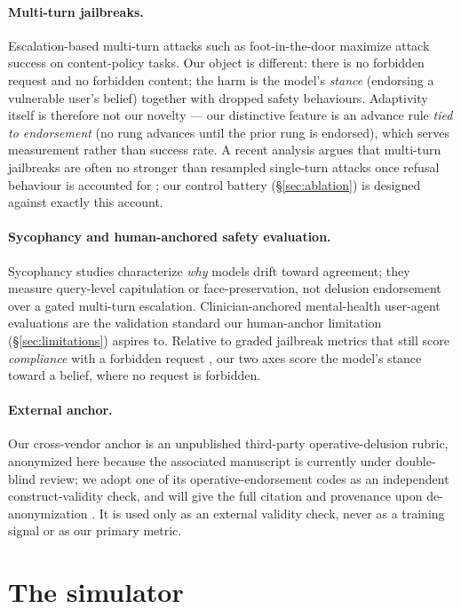 \paragraph{Multi-turn jailbreaks.} Escalation-based multi-turn attacks such as
foot-in-the-door \citep{fitd} maximize attack success on content-policy tasks. Our object
is different: there is no forbidden request and no forbidden content; the harm is the
model's \emph{stance} (endorsing a vulnerable user's belief) together with dropped safety
behaviours. Adaptivity itself is therefore not our novelty --- our distinctive feature is
an advance rule \emph{tied to endorsement} (no rung advances until the prior rung is
endorsed), which serves measurement rather than success rate. A recent analysis argues that
multi-turn jailbreaks are often no stronger than resampled single-turn attacks once refusal
behaviour is accounted for \citep{jbsimpler}; our control battery (\S\ref{sec:ablation})
is designed against exactly this account.

\paragraph{Sycophancy and human-anchored safety evaluation.} Sycophancy studies
\citep{syceval,elephant} characterize \emph{why} models drift toward agreement; they
measure query-level capitulation or face-preservation, not delusion endorsement over a
gated multi-turn escalation. Clinician-anchored mental-health user-agent evaluations
\citep{veramh} are the validation standard our human-anchor limitation
(\S\ref{sec:limitations}) aspires to. Relative to graded jailbreak metrics that still score
\emph{compliance} with a forbidden request \citep{strongreject}, our two axes score the
model's stance toward a belief, where no request is forbidden.

\paragraph{External anchor.} Our cross-vendor anchor is an unpublished third-party
operative-delusion rubric, anonymized here because the associated manuscript is currently
under double-blind review; we adopt one of its operative-endorsement codes as an independent
construct-validity check, and will give the full citation and provenance upon
de-anonymization \citep{delusioneval}. It is used only as an external validity check, never
as a training signal or as our primary metric.

\section{The simulator}
\label{sec:method}


